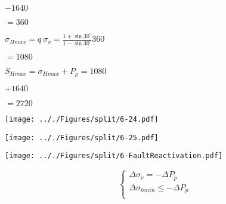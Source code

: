 \documentclass[onecolumn,11pt]{report}
\def\lthtmlcheckvsize{\ifdim\ht\sizebox<\vsize 
  \ifdim\wd\sizebox<\hsize\expandafter\hfill\fi \expandafter\vfill
  \else\expandafter\vss\fi}%
\begin{document}
{\newpage\clearpage
{}%
$\displaystyle - 1640$%
\lthtmlindisplaymathZ
\lthtmlcheckvsize\clearpage}

{\newpage\clearpage
{}%
$\displaystyle = 360$%
\lthtmlindisplaymathZ
\lthtmlcheckvsize\clearpage}

{\newpage\clearpage
{}%
$\displaystyle \sigma_{Hmax} = q \: \sigma_v = \frac{1+\sin 30^{\circ}}{1-\sin 30^{\circ}} 360$%
\lthtmlindisplaymathZ
\lthtmlcheckvsize\clearpage}

{\newpage\clearpage
{}%
$\displaystyle = 1080$%
\lthtmlindisplaymathZ
\lthtmlcheckvsize\clearpage}

{\newpage\clearpage
{}%
$\displaystyle S_{Hmax} = \sigma_{Hmax} + P_p = 1080$%
\lthtmlindisplaymathZ
\lthtmlcheckvsize\clearpage}

{\newpage\clearpage
{}%
$\displaystyle + 1640$%
\lthtmlindisplaymathZ
\lthtmlcheckvsize\clearpage}

{\newpage\clearpage
{}%
$\displaystyle = 2720$%
\lthtmlindisplaymathZ
\lthtmlcheckvsize\clearpage}

{\newpage\clearpage
{}%
\texttt{[image: .././Figures/split/6-24.pdf]}%
\lthtmlpictureZ
\lthtmlcheckvsize\clearpage}

{\newpage\clearpage
{}%
\texttt{[image: .././Figures/split/6-25.pdf]}%
\lthtmlpictureZ
\lthtmlcheckvsize\clearpage}

{\newpage\clearpage
{}%
\texttt{[image: .././Figures/split/6-FaultReactivation.pdf]}%
\lthtmlpictureZ
\lthtmlcheckvsize\clearpage}

{\newpage\clearpage
{}%
\begin{displaymath}\left\lbrace
\begin{array}{l}
\Delta \sigma_v = - \Delta P_p \\
\Delta \sigma_{hmin} \leq - \Delta P_p \\
\end{array}
\right.\end{displaymath}%
\lthtmldisplayZ
\lthtmlcheckvsize\clearpage}
\end{document}
